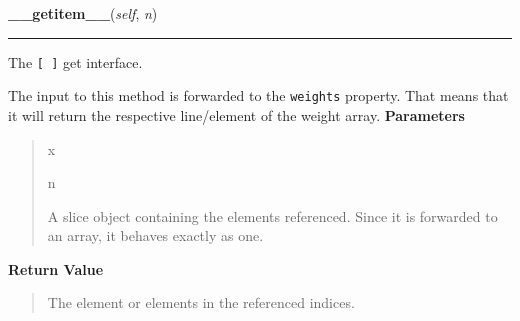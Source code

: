    \label{peach:nn:base:Layer:__getitem__}

    \vspace{0.5ex}

\hspace{.8\funcindent}\begin{boxedminipage}{\funcwidth}

    \raggedright \textbf{\_\_getitem\_\_}(\textit{self}, \textit{n})

    \vspace{-1.5ex}

    \rule{\textwidth}{0.5\fboxrule}
\setlength{\parskip}{2ex}

The \texttt{{[} {]}} get interface.

The input to this method is forwarded to the \texttt{weights} property. That
means that it will return the respective line/element of the weight
array.
\setlength{\parskip}{1ex}
      \textbf{Parameters}
      \vspace{-1ex}

      \begin{quote}
        \begin{Ventry}{x}

          \item[n]


A slice object containing the elements referenced. Since it is
forwarded to an array, it behaves exactly as one.
        \end{Ventry}

      \end{quote}

      \textbf{Return Value}
    \vspace{-1ex}

      \begin{quote}

The element or elements in the referenced indices.
      \end{quote}

    \end{boxedminipage}

    \label{peach:nn:base:Layer:__setitem__}

    \vspace{0.5ex}

